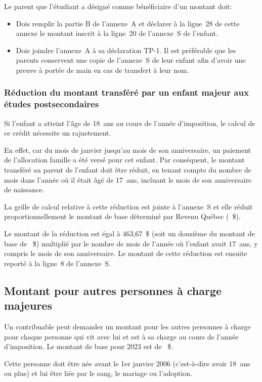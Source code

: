 Le parent que l'étudiant a désigné comme bénéficiaire d'un montant doit:
\begin{itemize}
	\item Dois remplir la partie B de l'annexe~A et déclarer à la ligne~28 de cette annexe le montant inscrit à la ligne~20 de l'annexe~S de l'enfant.
	\item Dois joindre l'annexe~A à sa déclaration TP-1. Il est préférable que les parents conservent une copie de l'annexe~S de leur enfant afin d'avoir une preuve à portée de main en cas de transfert à leur nom.
\end{itemize}

\subsubsection{Réduction du montant transféré par un enfant majeur aux études postsecondaires}
Si l'enfant a atteint l'âge de 18~ans au cours de l'année d'imposition, le calcul de ce crédit nécessite un rajustement.

En effet, car du mois de janvier jusqu'au mois de son anniversaire, un paiement de l'allocation famille a été versé pour cet enfant. Par conséquent, le montant transféré au parent de l'enfant doit être réduit, en tenant compte du nombre de mois dans l'année où il était âgé de 17~ans, incluant le mois de son anniversaire de naissance.

La grille de calcul relative à cette réduction est jointe à l'annexe~S et elle réduit proportionnellement le montant de base déterminé par Revenu Québec (~\$).

Le montant de la réduction est égal à 463,67~\$ (soit un douzième du montant de base de ~\$) multiplié par le nombre de mois de l'année où l'enfant avait 17~ans, y compris le mois de son anniversaire. Le montant de cette réduction est ensuite reporté à la ligne~8 de l'annexe~S.


\subsection{Montant pour autres personnes à charge majeures}
Un contribuable peut demander un montant pour les autres personnes à charge pour chaque personne qui vit avec lui et est à sa charge au cours de l'année d'imposition. Le montant de base pour 2023 est de ~\$.

Cette personne doit être née avant le 1er janvier 2006 (c'est-à-dire avoir 18~ans ou plus) et lui être liée par le sang, le mariage ou l'adoption.

